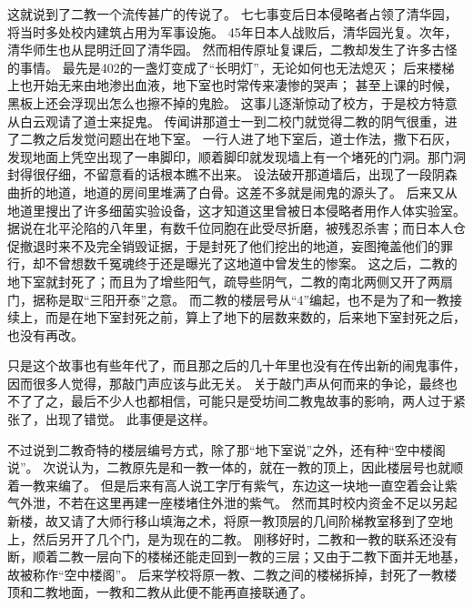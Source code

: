 这就说到了二教一个流传甚广的传说了。
七七事变后日本侵略者占领了清华园，将当时多处校内建筑占用为军事设施。
45年日本人战败后，清华园光复。次年，清华师生也从昆明迁回了清华园。
然而相传原址复课后，二教却发生了许多古怪的事情。
最先是402的一盏灯变成了“长明灯”，无论如何也无法熄灭；
后来楼梯上也开始无来由地渗出血液，地下室也时常传来凄惨的哭声；
甚至上课的时候，黑板上还会浮现出怎么也擦不掉的鬼脸。
这事儿逐渐惊动了校方，于是校方特意从白云观请了道士来捉鬼。
传闻讲那道士一到二校门就觉得二教的阴气很重，进了二教之后发觉问题出在地下室。
一行人进了地下室后，道士作法，撒下石灰，发现地面上凭空出现了一串脚印，顺着脚印就发现墙上有一个堵死的门洞。那门洞封得很仔细，不留意看的话根本瞧不出来。
设法破开那道墙后，出现了一段阴森曲折的地道，地道的房间里堆满了白骨。这差不多就是闹鬼的源头了。
后来又从地道里搜出了许多细菌实验设备，这才知道这里曾被日本侵略者用作人体实验室。
据说在北平沦陷的八年里，有数千位同胞在此受尽折磨，被残忍杀害；而日本人仓促撤退时来不及完全销毁证据，于是封死了他们挖出的地道，妄图掩盖他们的罪行，却不曾想数千冤魂终于还是曝光了这地道中曾发生的惨案。
这之后，二教的地下室就封死了；而且为了增些阳气，疏导些阴气，二教的南北两侧又开了两扇门，据称是取“三阳开泰”之意。
而二教的楼层号从“4”编起，也不是为了和一教接续上，而是在地下室封死之前，算上了地下的层数来数的，后来地下室封死之后，也没有再改。

只是这个故事也有些年代了，而且那之后的几十年里也没有在传出新的闹鬼事件，因而很多人觉得，那敲门声应该与此无关。
关于敲门声从何而来的争论，最终也不了了之，最后不少人也都相信，可能只是受坊间二教鬼故事的影响，两人过于紧张了，出现了错觉。
此事便是这样。

不过说到二教奇特的楼层编号方式，除了那“地下室说”之外，还有种“空中楼阁说”。
次说认为，二教原先是和一教一体的，就在一教的顶上，因此楼层号也就顺着一教来编了。
但是后来有高人说工字厅有紫气，东边这一块地一直空着会让紫气外泄，不若在这里再建一座楼堵住外泄的紫气。
然而其时校内资金不足以另起新楼，故又请了大师行移山填海之术，将原一教顶层的几间阶梯教室移到了空地上，然后另开了几个门，是为现在的二教。
刚移好时，二教和一教的联系还没有断，顺着二教一层向下的楼梯还能走回到一教的三层；又由于二教下面并无地基，故被称作“空中楼阁”。
后来学校将原一教、二教之间的楼梯拆掉，封死了一教楼顶和二教地面，一教和二教从此便不能再直接联通了。

